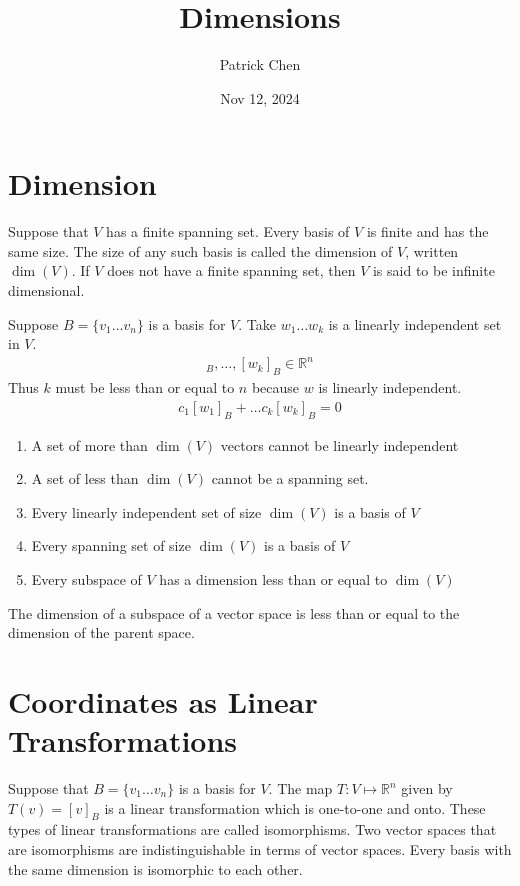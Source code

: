 \documentclass{article}
\title{Dimensions}
\author{Patrick Chen}
\date{Nov 12, 2024}
\theoremstyle{mytheoremstyle}
\theoremstyle{mytheoremstyle}
\theoremstyle{myproblemstyle}
\begin{document}
    \maketitle

    \section*{Dimension}
    Suppose that $V$ has a finite spanning set. Every basis of $V$ is finite and
    has the same size. The size of any such basis is called the dimension of
    $V$, written $\dim(V)$. If $V$ does not have a finite spanning set, then $V$
    is said to be infinite dimensional.

    Suppose $B=\{v_1\dots v_n\}$ is a basis for $V$. Take $w_1\dots w_k$ is a
    linearly independent set in $V$.
    \begin{align*}
        [w_1]_B,\dots ,[w_k]_B \in \mathbb{R}^n
    \end{align*}
    Thus $k$ must be less than or equal to $n$ because $w$ is linearly
    independent.
    \begin{align*}
        c_1[w_1]_B + \dots c_k[w_k]_B = 0
    \end{align*}

    \begin{enumerate}
        \item A set of more than $\dim(V)$ vectors cannot be linearly independent
        \item A set of less than $\dim(V)$ cannot be a spanning set.
        \item Every linearly independent set of size $\dim(V)$ is a basis of $V$
        \item Every spanning set of size $\dim(V)$ is a basis of $V$
        \item Every subspace of $V$ has a dimension less than or equal to $\dim(V)$
    \end{enumerate}

    The dimension of a subspace of a vector space is less than or equal to the
    dimension of the parent space.

    \section*{Coordinates as Linear Transformations}
    Suppose that $B=\{v_1\dots v_n\}$ is a basis for $V$. The map $T: V \mapsto
    \mathbb{R}^n$ given by $T(v)=[v]_B$ is a linear transformation which is
    one-to-one and onto. These types of linear transformations are called
    isomorphisms. Two vector spaces that are isomorphisms are indistinguishable
    in terms of vector spaces. Every basis with the same dimension is isomorphic
    to each other.
\end{document}
